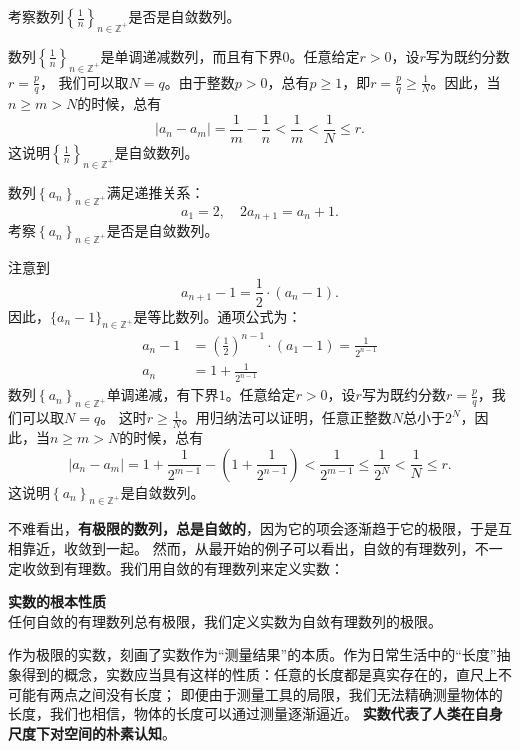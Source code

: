 \documentclass[12pt,UTF8]{ctexbook}
\begin{document}
\begin{et} 
    考察数列$\left\{\frac{1}{n}\right\}_{n\in\mathbb{Z}^+}$是否是自敛数列。\\
\end{et}
\begin{so}
    数列$\left\{\frac{1}{n}\right\}_{n\in\mathbb{Z}^+}$是单调递减数列，而且有下界$0$。任意给定$r>0$，设$r$写为既约分数$r = \frac{p}{q}$，
    我们可以取$N = q$。由于整数$p > 0$，总有$p \geqslant 1$，即$r = \frac{p}{q} \geqslant \frac{1}{N}$。因此，当$n\geqslant m>N$的时候，总有
    $$|a_n - a_m| = \frac{1}{m} - \frac{1}{n} < \frac{1}{m} < \frac{1}{N} \leqslant r.$$
    这说明$\left\{\frac{1}{n}\right\}_{n\in\mathbb{Z}^+}$是自敛数列。
\end{so}
\begin{et} 
    数列$\left\{a_n\right\}_{n\in\mathbb{Z}^+}$满足递推关系：
    $$a_1 = 2, \quad 2a_{n+1} = a_n + 1.$$
    \indent 考察$\left\{a_n\right\}_{n\in\mathbb{Z}^+}$是否是自敛数列。\\
\end{et}
\begin{so}
    注意到
    $$ a_{n+1} - 1 = \frac{1}{2}\cdot (a_n - 1). $$
    因此，$\{a_n - 1\}_{n\in\mathbb{Z}^+}$是等比数列。通项公式为：
    \begin{align*}
        a_n - 1 &= \left(\frac12\right)^{n-1}\cdot (a_1 - 1) = \frac{1}{2^{n-1}}  \\
        a_n &= 1 + \frac{1}{2^{n-1}} 
    \end{align*}
    数列$\left\{a_n\right\}_{n\in\mathbb{Z}^+}$单调递减，有下界$1$。任意给定$r>0$，设$r$写为既约分数$r = \frac{p}{q}$，我们可以取$N = q$。
    这时$r \geqslant \frac{1}{N}$。用归纳法可以证明，任意正整数$N$总小于$2^N$，因此，当$n\geqslant m>N$的时候，总有
    $$|a_n - a_m| = 1 + \frac{1}{2^{m-1}} - \left(1 + \frac{1}{2^{n-1}} \right) < \frac{1}{2^{m-1}} \leqslant \frac{1}{2^N} < \frac{1}{N} \leqslant r.$$
    这说明$\left\{a_n\right\}_{n\in\mathbb{Z}^+}$是自敛数列。
\end{so}

不难看出，\textbf{有极限的数列，总是自敛的}，因为它的项会逐渐趋于它的极限，于是互相靠近，收敛到一起。
然而，从最开始的例子可以看出，自敛的有理数列，不一定收敛到有理数。我们用自敛的有理数列来定义实数：
\begin{po}\textbf{实数的根本性质}\\
    任何自敛的有理数列总有极限，我们定义实数为自敛有理数列的极限。
\end{po}

作为极限的实数，刻画了实数作为“测量结果”的本质。作为日常生活中的“长度”抽象得到的概念，实数应当具有这样的性质：任意的长度都是真实存在的，直尺上不可能有两点之间没有长度；
即便由于测量工具的局限，我们无法精确测量物体的长度，我们也相信，物体的长度可以通过测量逐渐逼近。
\textbf{实数代表了人类在自身尺度下对空间的朴素认知}。
\end{document}
